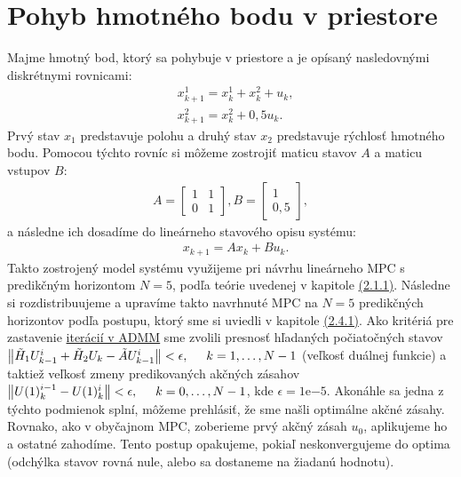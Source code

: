 \section{Pohyb hmotného bodu v priestore}
\label{sec:HB}
Majme hmotný bod, ktorý sa pohybuje v priestore a je opísaný nasledovnými diskrétnymi rovnicami:
\label{math:model_HB}
\begin{subequations}
	\begin{align}
	&x_{k+1}^{1} = x_{k}^{1} + x_{k}^{2} + u_{k},\\
	&x_{k+1}^{2} = x_{k}^{2} + 0,5u_{k}.
	\end{align}
	\end{subequations}
Prvý stav $x_{1}$ predstavuje polohu a druhý stav $x_{2}$ predstavuje rýchlosť hmotného bodu. Pomocou týchto rovníc si môžeme zostrojiť maticu stavov $A$ a maticu vstupov $B$:
\begin{align}
A = \begin{bmatrix}
1 &1\\
0 &1
\end{bmatrix},
B= \begin{bmatrix}
1\\
0,5
\end{bmatrix},
\end{align}
a následne ich dosadíme do lineárneho stavového opisu systému:
\begin{align}
& x_{k+1} = Ax_{k}+Bu_{k}.
\end{align}
Takto zostrojený model systému využijeme pri návrhu lineárneho MPC s predikčným horizontom $N = 5$, podľa teórie uvedenej v kapitole \hyperref[subse:MPC]{(2.1.1)}. Následne si rozdistribuujeme a upravíme takto navrhnuté MPC na $N = 5$ predikčných horizontov podľa postupu, ktorý sme si uviedli v kapitole \hyperref[subse:Lin_MPC_ADMM]{(2.4.1)}. Ako kritériá pre zastavenie \hyperref[subse:ADMM2]{iterácií v ADMM} sme zvolili presnosť hľadaných počiatočných stavov $\left\lVert\tilde{H}_{1}U_{k-1}^{i} + \tilde{H}_{2}U_{k} - \tilde{A}U_{k-1}^{i}\right\rVert < \epsilon,\hspace{0.5cm} k=1,\dots,N-1$ (veľkosť duálnej funkcie) a taktiež veľkosť zmeny predikovaných akčných zásahov $\left\lVert U(1)_{k}^{i-1}-U(1)_{k}^{i}\right\rVert < \epsilon,\hspace{0.5cm} k=0,\dots,N-1$, kde $\epsilon = 1\mathrm{e}{-5}$. Akonáhle sa jedna z týchto podmienok splní, môžeme prehlásiť, že sme našli optimálne akčné zásahy. Rovnako, ako v obyčajnom MPC, zoberieme prvý akčný zásah $u_{0}$, aplikujeme ho a ostatné zahodíme. Tento postup opakujeme, pokiaľ neskonvergujeme do optima (odchýlka stavov rovná nule, alebo sa dostaneme na žiadanú hodnotu).

